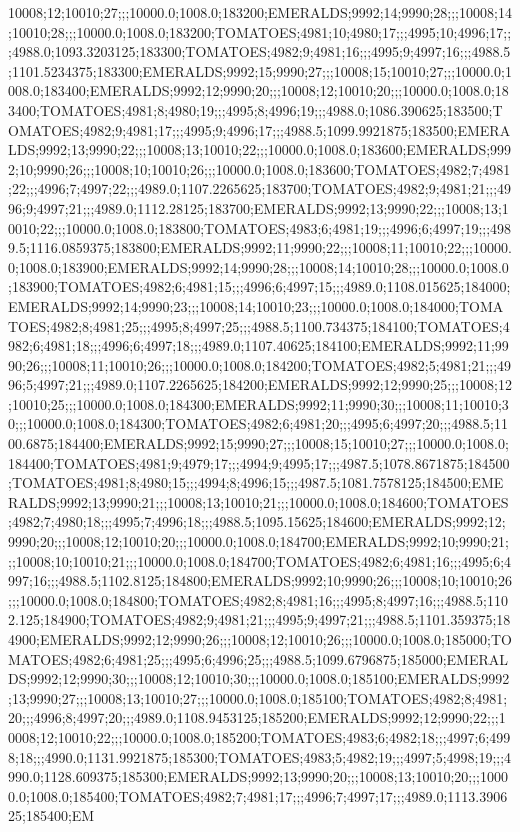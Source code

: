 10008;12;10010;27;;;10000.0;1008.0;183200;EMERALDS;9992;14;9990;28;;;10008;14;10010;28;;;10000.0;1008.0;183200;TOMATOES;4981;10;4980;17;;;4995;10;4996;17;;;4988.0;1093.3203125;183300;TOMATOES;4982;9;4981;16;;;4995;9;4997;16;;;4988.5;1101.5234375;183300;EMERALDS;9992;15;9990;27;;;10008;15;10010;27;;;10000.0;1008.0;183400;EMERALDS;9992;12;9990;20;;;10008;12;10010;20;;;10000.0;1008.0;183400;TOMATOES;4981;8;4980;19;;;4995;8;4996;19;;;4988.0;1086.390625;183500;TOMATOES;4982;9;4981;17;;;4995;9;4996;17;;;4988.5;1099.9921875;183500;EMERALDS;9992;13;9990;22;;;10008;13;10010;22;;;10000.0;1008.0;183600;EMERALDS;9992;10;9990;26;;;10008;10;10010;26;;;10000.0;1008.0;183600;TOMATOES;4982;7;4981;22;;;4996;7;4997;22;;;4989.0;1107.2265625;183700;TOMATOES;4982;9;4981;21;;;4996;9;4997;21;;;4989.0;1112.28125;183700;EMERALDS;9992;13;9990;22;;;10008;13;10010;22;;;10000.0;1008.0;183800;TOMATOES;4983;6;4981;19;;;4996;6;4997;19;;;4989.5;1116.0859375;183800;EMERALDS;9992;11;9990;22;;;10008;11;10010;22;;;10000.0;1008.0;183900;EMERALDS;9992;14;9990;28;;;10008;14;10010;28;;;10000.0;1008.0;183900;TOMATOES;4982;6;4981;15;;;4996;6;4997;15;;;4989.0;1108.015625;184000;EMERALDS;9992;14;9990;23;;;10008;14;10010;23;;;10000.0;1008.0;184000;TOMATOES;4982;8;4981;25;;;4995;8;4997;25;;;4988.5;1100.734375;184100;TOMATOES;4982;6;4981;18;;;4996;6;4997;18;;;4989.0;1107.40625;184100;EMERALDS;9992;11;9990;26;;;10008;11;10010;26;;;10000.0;1008.0;184200;TOMATOES;4982;5;4981;21;;;4996;5;4997;21;;;4989.0;1107.2265625;184200;EMERALDS;9992;12;9990;25;;;10008;12;10010;25;;;10000.0;1008.0;184300;EMERALDS;9992;11;9990;30;;;10008;11;10010;30;;;10000.0;1008.0;184300;TOMATOES;4982;6;4981;20;;;4995;6;4997;20;;;4988.5;1100.6875;184400;EMERALDS;9992;15;9990;27;;;10008;15;10010;27;;;10000.0;1008.0;184400;TOMATOES;4981;9;4979;17;;;4994;9;4995;17;;;4987.5;1078.8671875;184500;TOMATOES;4981;8;4980;15;;;4994;8;4996;15;;;4987.5;1081.7578125;184500;EMERALDS;9992;13;9990;21;;;10008;13;10010;21;;;10000.0;1008.0;184600;TOMATOES;4982;7;4980;18;;;4995;7;4996;18;;;4988.5;1095.15625;184600;EMERALDS;9992;12;9990;20;;;10008;12;10010;20;;;10000.0;1008.0;184700;EMERALDS;9992;10;9990;21;;;10008;10;10010;21;;;10000.0;1008.0;184700;TOMATOES;4982;6;4981;16;;;4995;6;4997;16;;;4988.5;1102.8125;184800;EMERALDS;9992;10;9990;26;;;10008;10;10010;26;;;10000.0;1008.0;184800;TOMATOES;4982;8;4981;16;;;4995;8;4997;16;;;4988.5;1102.125;184900;TOMATOES;4982;9;4981;21;;;4995;9;4997;21;;;4988.5;1101.359375;184900;EMERALDS;9992;12;9990;26;;;10008;12;10010;26;;;10000.0;1008.0;185000;TOMATOES;4982;6;4981;25;;;4995;6;4996;25;;;4988.5;1099.6796875;185000;EMERALDS;9992;12;9990;30;;;10008;12;10010;30;;;10000.0;1008.0;185100;EMERALDS;9992;13;9990;27;;;10008;13;10010;27;;;10000.0;1008.0;185100;TOMATOES;4982;8;4981;20;;;4996;8;4997;20;;;4989.0;1108.9453125;185200;EMERALDS;9992;12;9990;22;;;10008;12;10010;22;;;10000.0;1008.0;185200;TOMATOES;4983;6;4982;18;;;4997;6;4998;18;;;4990.0;1131.9921875;185300;TOMATOES;4983;5;4982;19;;;4997;5;4998;19;;;4990.0;1128.609375;185300;EMERALDS;9992;13;9990;20;;;10008;13;10010;20;;;10000.0;1008.0;185400;TOMATOES;4982;7;4981;17;;;4996;7;4997;17;;;4989.0;1113.390625;185400;EM